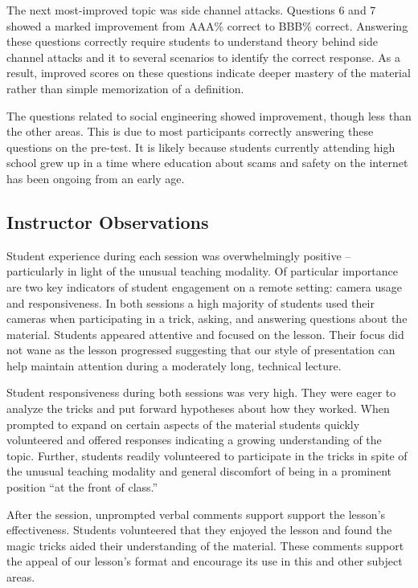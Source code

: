 The next most-improved topic was side channel attacks.  Questions 6 and 7
showed a marked improvement from AAA\% correct to BBB\% correct.  Answering
these questions correctly require students to understand theory behind side
channel attacks and it to several scenarios to identify the correct
response.  As a result,  improved scores on these questions indicate deeper
mastery of the material rather than simple memorization of a definition.

The questions related to social engineering showed improvement, though less
than the other areas.  This is due to most participants correctly answering
these questions on the pre-test.  It is likely because students currently
attending high school grew up in a time where education about scams and
safety on the internet has been ongoing from an early age.


\subsection{Instructor Observations}

Student experience during each session was overwhelmingly positive --
particularly in light of the unusual teaching modality.
Of particular importance are two key indicators
of student engagement on a remote setting: camera usage and
responsiveness.  In both sessions a high majority of students used their
cameras when participating in a trick, asking, and answering questions
about the material.  Students appeared attentive and focused on the lesson.
Their focus did not wane as the lesson progressed suggesting that our
style of presentation can help maintain attention during a moderately long,
technical lecture.

Student responsiveness during both sessions was very high.
They were eager to analyze the
tricks and put forward hypotheses about how they worked.
When prompted to
expand on certain aspects of the material students quickly volunteered and
offered responses indicating a growing understanding of the topic.
Further, students readily volunteered to participate in the tricks in spite
of the unusual teaching modality and general discomfort of being in a
prominent position ``at the front of class.''

After the session,
unprompted verbal comments support support the lesson's effectiveness.
Students volunteered that they enjoyed the
lesson and found the magic tricks aided their understanding of the
material.  These comments support the appeal of our lesson's format and
encourage its use in this and other subject areas.

